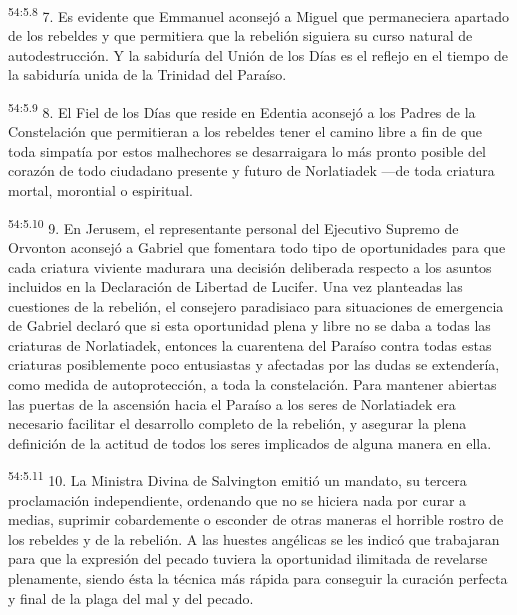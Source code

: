 \par
\textsuperscript{54:5.8} 7. Es evidente que Emmanuel aconsejó a Miguel que permaneciera apartado de los rebeldes y que permitiera que la rebelión siguiera su curso natural de autodestrucción. Y la sabiduría del Unión de los Días es el reflejo en el tiempo de la sabiduría unida de la Trinidad del Paraíso.

\par
\textsuperscript{54:5.9} 8. El Fiel de los Días que reside en Edentia aconsejó a los Padres de la Constelación que permitieran a los rebeldes tener el camino libre a fin de que toda simpatía por estos malhechores se desarraigara lo más pronto posible del corazón de todo ciudadano presente y futuro de Norlatiadek ---de toda criatura mortal, morontial o espiritual.

\par
\textsuperscript{54:5.10} 9. En Jerusem, el representante personal del Ejecutivo Supremo de Orvonton aconsejó a Gabriel que fomentara todo tipo de oportunidades para que cada criatura viviente madurara una decisión deliberada respecto a los asuntos incluidos en la Declaración de Libertad de Lucifer. Una vez planteadas las cuestiones de la rebelión, el consejero paradisiaco para situaciones de emergencia de Gabriel declaró que si esta oportunidad plena y libre no se daba a todas las criaturas de Norlatiadek, entonces la cuarentena del Paraíso contra todas estas criaturas posiblemente poco entusiastas y afectadas por las dudas se extendería, como medida de autoprotección, a toda la constelación. Para mantener abiertas las puertas de la ascensión hacia el Paraíso a los seres de Norlatiadek era necesario facilitar el desarrollo completo de la rebelión, y asegurar la plena definición de la actitud de todos los seres implicados de alguna manera en ella.

\par
\textsuperscript{54:5.11} 10. La Ministra Divina de Salvington emitió un mandato, su tercera proclamación independiente, ordenando que no se hiciera nada por curar a medias, suprimir cobardemente o esconder de otras maneras el horrible rostro de los rebeldes y de la rebelión. A las huestes angélicas se les indicó que trabajaran para que la expresión del pecado tuviera la oportunidad ilimitada de revelarse plenamente, siendo ésta la técnica más rápida para conseguir la curación perfecta y final de la plaga del mal y del pecado.

